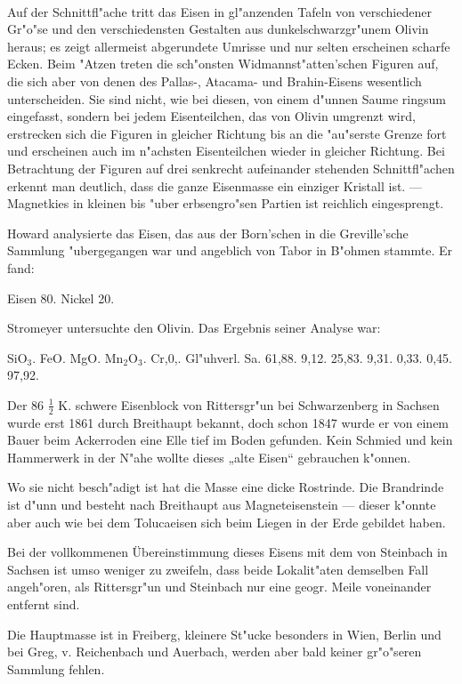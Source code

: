 \documentclass[a4paper, 11pt, oneside]{article}
\begin{document}
\paragraph{}
Auf der Schnittfl"ache tritt das Eisen in gl"anzenden Tafeln von verschiedener Gr"o"se und den verschiedensten Gestalten aus dunkelschwarzgr"unem Olivin heraus; es zeigt allermeist abgerundete Umrisse und nur selten erscheinen scharfe Ecken. Beim "Atzen treten die sch"onsten Widmannst"atten'schen Figuren auf, die sich aber von denen des Pallas-, Atacama- und Brahin-Eisens wesentlich unterscheiden. Sie sind nicht, wie bei diesen, von einem d"unnen Saume ringsum eingefasst, sondern bei jedem Eisenteilchen, das von Olivin umgrenzt wird, erstrecken sich die Figuren in gleicher Richtung bis an die "au"serste Grenze fort und erscheinen auch im n"achsten Eisenteilchen wieder in gleicher Richtung. Bei Betrachtung der Figuren auf drei senkrecht aufeinander stehenden Schnittfl"achen erkennt man deutlich, dass die ganze Eisenmasse ein einziger Kristall ist. --- Magnetkies in kleinen bis "uber erbsengro"sen Partien ist reichlich eingesprengt.

Howard analysierte das Eisen, das aus der Born'schen in die Greville'sche Sammlung "ubergegangen war und angeblich von Tabor in B"ohmen stammte. Er fand:

Eisen 80.  
Nickel 20.

Stromeyer untersuchte den Olivin. Das Ergebnis seiner Analyse war:

SiO$_{3}$. FeO. MgO. Mn$_{2}$O$_{3}$. Cr,0,. Gl"uhverl. Sa.  
61,88. 9,12. 25,83. 9,31. 0,33. 0,45. 97,92.

Der 86 $\frac{1}{2}$ K. schwere Eisenblock von Rittersgr"un bei Schwarzenberg in Sachsen wurde erst 1861 durch Breithaupt bekannt, doch schon 1847 wurde er von einem Bauer beim Ackerroden eine Elle tief im Boden gefunden. Kein Schmied und kein Hammerwerk in der N"ahe wollte dieses „alte Eisen“ gebrauchen k"onnen.

Wo sie nicht besch"adigt ist hat die Masse eine dicke Rostrinde. Die Brandrinde ist d"unn und besteht nach Breithaupt aus Magneteisenstein --- dieser k"onnte aber auch wie bei dem Tolucaeisen sich beim Liegen in der Erde gebildet haben.

Bei der vollkommenen Übereinstimmung dieses Eisens mit dem von Steinbach in Sachsen ist umso weniger zu zweifeln, dass beide Lokalit"aten demselben Fall angeh"oren, als Rittersgr"un und Steinbach nur eine geogr. Meile voneinander entfernt sind.

Die Hauptmasse ist in Freiberg, kleinere St"ucke besonders in Wien, Berlin und bei Greg, v. Reichenbach und Auerbach, werden aber bald keiner gr"o"seren Sammlung fehlen.
\end{document}
